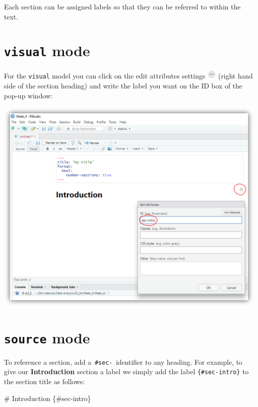 \documentclass[
  letterpaper,
  DIV=11,
  numbers=noendperiod]{scrartcl}
\newenvironment{Shaded}{\begin{snugshade}}{\end{snugshade}}
\newcommand{\CommentTok}[1]{\textcolor[rgb]{0.37,0.37,0.37}{#1}}
\begin{document}
Each section can be assigned labels so that they can be referred to
within the text.

\section{\texorpdfstring{\texttt{visual} mode}{visual mode}}

For the \texttt{visual} model you can click on the edit attributes
settings
\includegraphics[width=0.17708in,height=\textheight]{images/threedots.png}
(right hand side of the section heading) and write the label you want on
the ID box of the pop-up window:

\begin{center}
\includegraphics[width=5.39583in,height=\textheight]{images/quarto4.png}
\end{center}

\section{\texorpdfstring{\texttt{source} mode}{source mode}}

To reference a section, add a~\texttt{\#sec-}~identifier to any heading.
For example, to give our \textbf{Introduction} section a label we simply
add the label \texttt{\{\#sec-intro\}} to the section title as follows:

\begin{Shaded}
\begin{Highlighting}[]
\CommentTok{\# Introduction \{\#sec{-}intro\}}
\end{Highlighting}
\end{Shaded}
\end{document}
